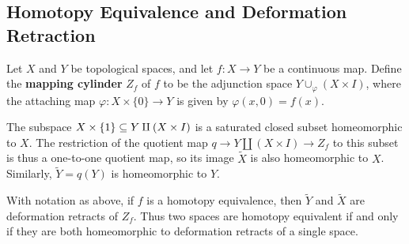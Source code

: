 \subsection{Homotopy Equivalence and Deformation Retraction}
Let $X$ and $Y$ be topological spaces, and let $f:X\to Y$ be a continuous map.
Define the \textbf{mapping cylinder} $Z_f$ of $f$ to be the adjunction space $Y\cup_\varphi(X\times I)$, where the attaching map $\varphi:X\times\{0\}\to Y$ is given by $\varphi(x,0)=f(x)$.\par
The subspace $X\times\{1\}\subseteq Y\amalg(X\times I)$ is a saturated closed subset homeomorphic to $X$. The restriction of the quotient map $q\to Y\amalg(X\times I)\to Z_f$ to this subset is thus a one-to-one quotient map, so its image $\widetilde{X}$ is also homeomorphic to $X$. Similarly, $\widetilde{Y}=q(Y)$ is homeomorphic to $Y$.
\begin{proposition}
With notation as above, if $f$ is a homotopy equivalence, then $\widetilde{Y}$
and $\widetilde{X}$ are deformation retracts of $Z_f$. Thus two spaces are homotopy equivalent if and only if they are both homeomorphic to deformation retracts of a single space.
\end{proposition}
